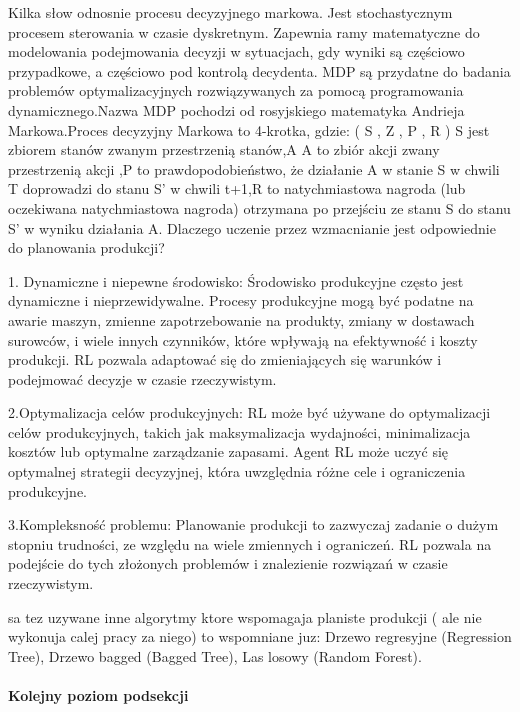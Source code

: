    Kilka słow odnosnie procesu decyzyjnego markowa. Jest stochastycznym procesem sterowania w czasie dyskretnym. Zapewnia ramy matematyczne do modelowania podejmowania decyzji w sytuacjach, gdy wyniki są częściowo przypadkowe, a częściowo pod kontrolą decydenta. MDP są przydatne do badania problemów optymalizacyjnych rozwiązywanych za pomocą programowania dynamicznego.Nazwa MDP pochodzi od rosyjskiego matematyka Andrieja Markowa.Proces decyzyjny Markowa to 4-krotka, gdzie: ( S , Z , P  , R  ) S jest zbiorem stanów zwanym przestrzenią stanów,A A to zbiór akcji zwany przestrzenią akcji ,P to prawdopodobieństwo, że działanie A w stanie S w chwili T doprowadzi do stanu S' w chwili t+1,R to natychmiastowa nagroda (lub oczekiwana natychmiastowa nagroda) otrzymana po przejściu ze stanu S do stanu S' w wyniku działania A.
 \vspace{\baselineskip} 
Dlaczego uczenie przez wzmacnianie jest odpowiednie do planowania produkcji?


    1. Dynamiczne i niepewne środowisko: Środowisko produkcyjne często jest dynamiczne i nieprzewidywalne. Procesy produkcyjne mogą być podatne na awarie maszyn, zmienne zapotrzebowanie na produkty, zmiany w dostawach surowców, i wiele innych czynników, które wpływają na efektywność i koszty produkcji. RL pozwala adaptować się do zmieniających się warunków i podejmować decyzje w czasie rzeczywistym.

    2.Optymalizacja celów produkcyjnych: RL może być używane do optymalizacji celów produkcyjnych, takich jak maksymalizacja wydajności, minimalizacja kosztów lub optymalne zarządzanie zapasami. Agent RL może uczyć się optymalnej strategii decyzyjnej, która uwzględnia różne cele i ograniczenia produkcyjne.

    3.Kompleksność problemu: Planowanie produkcji to zazwyczaj zadanie o dużym stopniu trudności, ze względu na wiele zmiennych i ograniczeń. RL pozwala na podejście do tych złożonych problemów i znalezienie rozwiązań w czasie rzeczywistym.


    sa tez uzywane inne algorytmy ktore wspomagaja planiste produkcji ( ale nie wykonuja calej pracy za niego) to wspomniane juz:  Drzewo regresyjne (Regression Tree), Drzewo bagged  (Bagged Tree), Las losowy (Random Forest).

\cite{guo2020}\cite{wiku2023}\cite{wikr2023}\cite{wikma2023}\cite{Naw2009}\cite{Faust2019}\cite{gar2020}




\paragraph{Kolejny poziom podsekcji}

